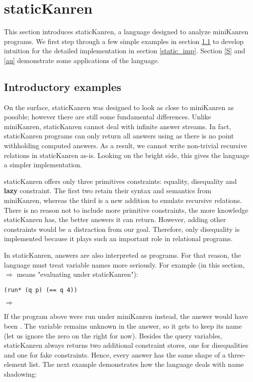 \section{staticKanren}\label{static}
This section introduces staticKanren, a language designed to analyze miniKanren programs. We first step through a few simple examples in section \ref{static_intro} to develop intuition for the detailed implementation in section \ref{static_imp}. Section \ref{S} and \ref{au} demonstrate some applications of the language.

\subsection{Introductory examples}\label{static_intro}
On the surface, staticKanren was designed to look as close to miniKanren as possible; however there are still some fundamental differences. Unlike miniKanren, staticKanren cannot deal with infinite answer streams. In fact, staticKanren programs can only return all answers using  as there is no point withholding computed answers. As a result, we cannot write non-trivial recursive relations in staticKanren as-is. Looking on the bright side, this gives the language a simpler implementation.

staticKanren offers only three primitives constraints: equality, disequality and \textbf{lazy} constraint. The first two retain their syntax and semantics from miniKanren, whereas the third is a new addition to emulate recursive relations. There is no reason not to include more primitive constraints, the more knowledge staticKanren has, the better answers it can return. However, adding other constraints would be a distraction from our goal. Therefore, only disequality is implemented because it plays such an important role in relational programs.

In staticKanren, answers are also interpreted as programs. For that reason, the language must treat variable names more seriously. For example (in this section, $\Rightarrow$ means "evaluating under staticKanren"):


\begin{lstlisting}
(run* (q p) (== q 4))
\end{lstlisting}
$\Rightarrow$ 

If the program above were run under miniKanren instead, the answer would have been . The variable  remains unknown in the answer, so it gets to keep its name (let us ignore the zero on the right for now). Besides the query variables, staticKanren always returns two additional constraint stores, one for disequalities and one for fake constraints. Hence, every answer has the same shape of a three-element list.  The next example demonstrates how the language deals with name shadowing:

